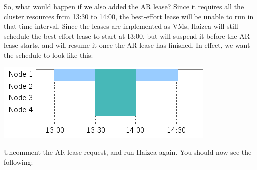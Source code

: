So, what would happen if we also added the AR lease? Since it requires all the cluster resources from 13:30 to 14:00, the best-effort lease will be unable to run in that time interval. Since the leases are implemented as VMs, Haizea will still schedule the best-effort lease to start at 13:00, but will suspend it before the AR lease starts, and will resume it once the AR lease has finished. In effect, we want the schedule to look like this:

\begin{center}
\includegraphics{images/quickstart_leasegraph3.png}
\end{center}

Uncomment the AR lease request, and run Haizea again. You should now see the following:

